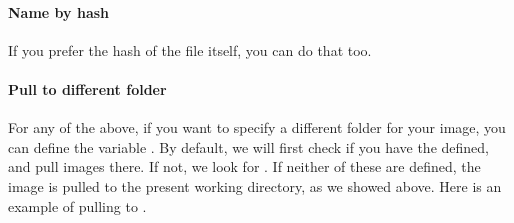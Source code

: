 \documentclass[letterpaper,10pt,english]{sphinxmanual}
\begin{document}
\paragraph{Name by hash}
\label{\detokenize{appendix:name-by-hash}}
If you prefer the hash of the file itself, you can do that too.

%
\begin{sphinxVerbatim}[commandchars=\\\{\}]
   

  

    
\end{sphinxVerbatim}


\paragraph{Pull to different folder}
\label{\detokenize{appendix:pull-to-different-folder}}
For any of the above, if you want to specify a different folder for
your image, you can define the variable . By default, we will first
check if you have the  defined, and pull images there. If not, we look
for . If neither of these are defined, the image is pulled to the
present working directory, as we showed above. Here is an example of
pulling to  .

%
\begin{sphinxVerbatim}[commandchars=\\\{\}]

  

  

    
\end{sphinxVerbatim}
\end{document}
